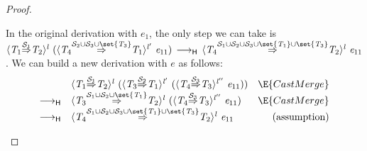 \documentclass[9pt]{extarticle}
\newcommand{\ottnt}[1]{\mathit{#1}}
\begin{document}
{\begin{lemma}
\begin{proof}
{\begin{itemize}
      In the original derivation with $\ottnt{e_{{\mathrm{1}}}}$, the only step we can
      take is $ \langle  \ottnt{T_{{\mathrm{1}}}}  \mathord{ \overset{ \mathcal{S}_{{\mathrm{1}}} }{\Rightarrow} }  \ottnt{T_{{\mathrm{2}}}}  \rangle^{ \ottnt{l} } ~   (  \langle  \ottnt{T_{{\mathrm{4}}}}  \mathord{ \overset{   \mathcal{S}_{{\mathrm{2}}}  \cup  \mathcal{S}_{{\mathrm{3}}}   \cup   \set{  \ottnt{T_{{\mathrm{3}}}}  }   }{\Rightarrow} }  \ottnt{T_{{\mathrm{1}}}}  \rangle^{ \ottnt{l'} } ~  \ottnt{e_{{\mathrm{11}}}}  )   \,  \longrightarrow _{  \mathsf{H}  }  \,  \langle  \ottnt{T_{{\mathrm{4}}}}  \mathord{ \overset{     \mathcal{S}_{{\mathrm{1}}}  \cup  \mathcal{S}_{{\mathrm{2}}}   \cup  \mathcal{S}_{{\mathrm{3}}}   \cup   \set{  \ottnt{T_{{\mathrm{1}}}}  }    \cup   \set{  \ottnt{T_{{\mathrm{3}}}}  }   }{\Rightarrow} }  \ottnt{T_{{\mathrm{2}}}}  \rangle^{ \ottnt{l} } ~  \ottnt{e_{{\mathrm{11}}}} $. We can build a new
      derivation with $\ottnt{e}$ as follows:
      \[ \begin{array}{rlr}
        &  \langle  \ottnt{T_{{\mathrm{1}}}}  \mathord{ \overset{ \mathcal{S}_{{\mathrm{1}}} }{\Rightarrow} }  \ottnt{T_{{\mathrm{2}}}}  \rangle^{ \ottnt{l} } ~   (  \langle  \ottnt{T_{{\mathrm{3}}}}  \mathord{ \overset{ \mathcal{S}_{{\mathrm{2}}} }{\Rightarrow} }  \ottnt{T_{{\mathrm{1}}}}  \rangle^{ \ottnt{l'} } ~   (  \langle  \ottnt{T_{{\mathrm{4}}}}  \mathord{ \overset{ \mathcal{S}_{{\mathrm{3}}} }{\Rightarrow} }  \ottnt{T_{{\mathrm{3}}}}  \rangle^{ \ottnt{l''} } ~  \ottnt{e_{{\mathrm{11}}}}  )   )   & \E{CastMerge} \\
         \longrightarrow _{  \mathsf{H}  } &  \langle  \ottnt{T_{{\mathrm{3}}}}  \mathord{ \overset{   \mathcal{S}_{{\mathrm{1}}}  \cup  \mathcal{S}_{{\mathrm{2}}}   \cup   \set{  \ottnt{T_{{\mathrm{1}}}}  }   }{\Rightarrow} }  \ottnt{T_{{\mathrm{2}}}}  \rangle^{ \ottnt{l} } ~   (  \langle  \ottnt{T_{{\mathrm{4}}}}  \mathord{ \overset{ \mathcal{S}_{{\mathrm{3}}} }{\Rightarrow} }  \ottnt{T_{{\mathrm{3}}}}  \rangle^{ \ottnt{l''} } ~  \ottnt{e_{{\mathrm{11}}}}  )   & \E{CastMerge} \\
         \longrightarrow _{  \mathsf{H}  } &  \langle  \ottnt{T_{{\mathrm{4}}}}  \mathord{ \overset{     \mathcal{S}_{{\mathrm{1}}}  \cup  \mathcal{S}_{{\mathrm{2}}}   \cup  \mathcal{S}_{{\mathrm{3}}}   \cup   \set{  \ottnt{T_{{\mathrm{1}}}}  }    \cup   \set{  \ottnt{T_{{\mathrm{3}}}}  }   }{\Rightarrow} }  \ottnt{T_{{\mathrm{2}}}}  \rangle^{ \ottnt{l} } ~  \ottnt{e_{{\mathrm{11}}}}  & \text{(assumption)} \\
      \end{array} \]


\end{itemize}}
\end{proof}
\end{lemma}}
\end{document}
